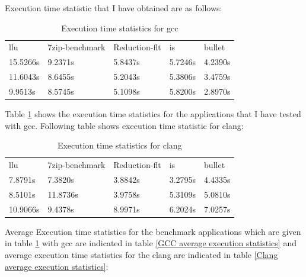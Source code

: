 \documentclass[16pt]{article}
\begin{document}
    \vspace{5pt}
    \noindent
    Execution time statistic that I have obtained are as follows:

    \noindent
    \begin{table}[h!]
    \centering
    \begin{tabular}{ |p{2.5cm}|p{2.5cm}|p{2.5cm}|p{2.5cm}|p{2.5cm}| }
    \hline
    \rowcolor{lightgray}\multicolumn{5}{|c|}{Benchmark Results GCC} \\
    \hline
    \rowcolor{green!80!yellow!50}
    llu & 7zip-benchmark & Reduction-flt & is & bullet \\
    \hline
    15.5266s & 9.2371s & 5.8437s  & 5.7246s  & 4.2390s  \\
    11.6043s & 8.6455s & 5.2043s  & 5.3806s  & 3.4759s \\
    9.9513s  & 8.5745s &  5.1098s & 5.8200s & 2.8970s \\
    \hline
    \end{tabular}
    \caption{Execution time statistics for gcc}
    \label{GCC execution statistics}
    \end{table}

    \noindent
    Table \ref{GCC execution statistics} shows the execution time statistics for the applications that I have tested with gcc. Following table shows execution 
    time statistic for clang:

    \noindent
    \begin{table}[h!]
    \centering
    \begin{tabular}{ |p{2.5cm}|p{2.5cm}|p{2.5cm}|p{2.5cm}|p{2.5cm}| }
    \hline
    \rowcolor{lightgray}\multicolumn{5}{|c|}{Benchmark Results Clang} \\
    \hline
    \rowcolor{green!80!yellow!50}
    llu & 7zip-benchmark & Reduction-flt & is & bullet \\
    \hline
    7.8791s & 7.3820s & 3.8842s & 3.2795s & 4.4335s  \\
    8.5101s & 11.8736s & 3.9758s & 5.3109s   & 5.0810s \\
    10.9066s  & 9.4378s &  8.9971s & 6.2024s & 7.0257s \\
    \hline
    \end{tabular}
    \caption{Execution time statistics for clang}
    \label{Clang execution statistics}
    \end{table}

    \noindent
    Average Execution time statistics for the benchmark applications which are given in table \ref{GCC execution statistics} with gcc are indicated in table \ref{GCC average execution statistics} and average execution time statistics for the clang are indicated in table \ref{Clang average execution statistics}:
\end{document}
